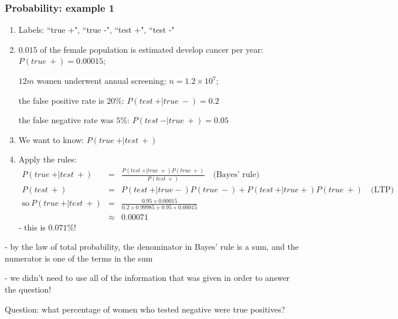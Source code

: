 \documentclass[t,8pt]{beamer}%
\begin{document}
	\begin{frame}
		\frametitle{Probability: example 1}
        {\small
		\begin{enumerate}
            \item Labels: ``true +", ``true -", ``test +", ``test -"
			\item $0.015$ of the female population is estimated develop cancer per year: $P(true\ +)=0.00015$; \par
			$12m$ women underwent annual screening: $n=1.2\times 10^7$; \par
			the false positive rate is $20\%$: $P(test\ +\vert true\ -)=0.2$ \par
			the false negative rate was $5\%$: $P(test\ -\vert true\ +)=0.05$
            \item We want to know: $P(true\ +\vert test\ +)$
        \item Apply the rules:
			\begin{eqnarray*}
				P(true\ +\vert test\ +)&=&\frac{P(test\ +\vert true\ +)P(true\ +)}{P(test\ +)}\quad\text{(Bayes' rule)}\\
				P(test\ +)&=&P(test\ +\vert true -)P(true\ -)+P(test\ +\vert true +)P(true\ +)\quad\text{(LTP)}\\
				\text{so}\ P(true\ +\vert test\ +)&=&\frac{0.95\times 0.00015}{0.2\times 0.99985+0.95\times 0.00015}\\
				&\approx&0.00071
			\end{eqnarray*}
		- this is $0.071\%$! %
        \end{enumerate}
        }
		{\small\color{NavyBlue} - by the law of total probability, the denominator in Bayes' rule is a sum, and the numerator is one of the terms in the sum \par
			- we didn't need to use all of the information that was given in order to answer the question!} \par
		Question: what percentage of women who tested negative were true positives?
	\end{frame}
	
\end{document}
